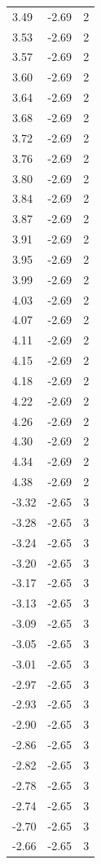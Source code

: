 \begin{longtable}{lrr}
  3.49 & -2.69 & 2 \\
  3.53 & -2.69 & 2 \\
  3.57 & -2.69 & 2 \\
  3.60 & -2.69 & 2 \\
  3.64 & -2.69 & 2 \\
  3.68 & -2.69 & 2 \\
  3.72 & -2.69 & 2 \\
  3.76 & -2.69 & 2 \\
  3.80 & -2.69 & 2 \\
  3.84 & -2.69 & 2 \\
  3.87 & -2.69 & 2 \\
  3.91 & -2.69 & 2 \\
  3.95 & -2.69 & 2 \\
  3.99 & -2.69 & 2 \\
  4.03 & -2.69 & 2 \\
  4.07 & -2.69 & 2 \\
  4.11 & -2.69 & 2 \\
  4.15 & -2.69 & 2 \\
  4.18 & -2.69 & 2 \\
  4.22 & -2.69 & 2 \\
  4.26 & -2.69 & 2 \\
  4.30 & -2.69 & 2 \\
  4.34 & -2.69 & 2 \\
  4.38 & -2.69 & 2 \\
  -3.32 & -2.65 & 3 \\
  -3.28 & -2.65 & 3 \\
  -3.24 & -2.65 & 3 \\
  -3.20 & -2.65 & 3 \\
  -3.17 & -2.65 & 3 \\
  -3.13 & -2.65 & 3 \\
  -3.09 & -2.65 & 3 \\
  -3.05 & -2.65 & 3 \\
  -3.01 & -2.65 & 3 \\
  -2.97 & -2.65 & 3 \\
  -2.93 & -2.65 & 3 \\
  -2.90 & -2.65 & 3 \\
  -2.86 & -2.65 & 3 \\
  -2.82 & -2.65 & 3 \\
  -2.78 & -2.65 & 3 \\
  -2.74 & -2.65 & 3 \\
  -2.70 & -2.65 & 3 \\
  -2.66 & -2.65 & 3 \\

\end{longtable}

